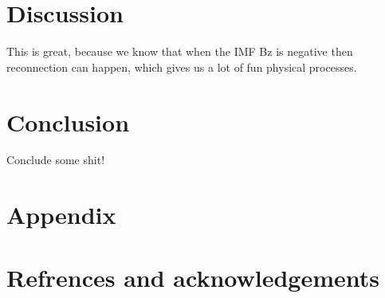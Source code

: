 \documentclass[norsk,a4paper,11pt]{article}
\begin{document}
\begin{multicols}{2}


\section{Discussion} %
\label{sec:discussion}



This is great, because we know that when the IMF Bz is negative then reconnection can happen, which gives us a lot of fun physical processes.
\\












\section{Conclusion} %
\label{sec:conclusion}

Conclude some shit!



\section{Appendix} %
\label{sec:appendix}


\section{Refrences and acknowledgements} %
\label{sec:refrences_and_acknowledgements}






\end{multicols}
\end{document}
